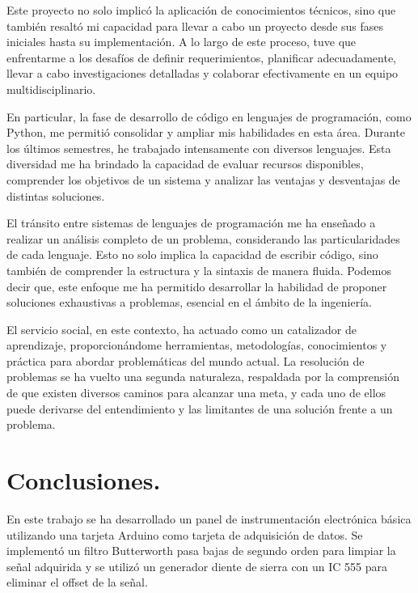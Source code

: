 \documentclass[a4paper,12pt]{article}
\begin{document}
    Este proyecto no solo implicó la aplicación de conocimientos técnicos, sino que también resaltó mi capacidad para llevar a cabo un proyecto desde sus fases iniciales hasta su implementación. A lo largo de este proceso, tuve que enfrentarme a los desafíos de definir requerimientos, planificar adecuadamente, llevar a cabo investigaciones detalladas y colaborar efectivamente en un equipo multidisciplinario.
    
    En particular, la fase de desarrollo de código en lenguajes de programación, como Python, me permitió consolidar y ampliar mis habilidades en esta área. Durante los últimos semestres, he trabajado intensamente con diversos lenguajes. Esta diversidad me ha brindado la capacidad de evaluar recursos disponibles, comprender los objetivos de un sistema y analizar las ventajas y desventajas de distintas soluciones.
    
    El tránsito entre sistemas de lenguajes de programación me ha enseñado a realizar un análisis completo de un problema, considerando las particularidades de cada lenguaje. Esto no solo implica la capacidad de escribir código, sino también de comprender la estructura y la sintaxis de manera fluida. Podemos decir que, este enfoque me ha permitido desarrollar la habilidad de proponer soluciones exhaustivas a problemas, esencial en el ámbito de la ingeniería.
    
    El servicio social, en este contexto, ha actuado como un catalizador de aprendizaje, proporcionándome herramientas, metodologías, conocimientos y práctica para abordar problemáticas del mundo actual. La resolución de problemas se ha vuelto una segunda naturaleza, respaldada por la comprensión de que existen diversos caminos para alcanzar una meta, y cada uno de ellos puede derivarse del entendimiento y las limitantes de una solución frente a un problema.
    


    \section{Conclusiones.}
        
        En este trabajo se ha desarrollado un panel de instrumentación electrónica básica utilizando una tarjeta Arduino como tarjeta de adquisición de datos. Se implementó un filtro Butterworth pasa bajas de segundo orden para limpiar la señal adquirida y se utilizó un generador diente de sierra con un IC 555 para eliminar el offset de la señal. 
        
\end{document}
